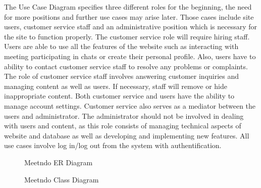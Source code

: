 \documentclass[conference]{IEEEtran}
\begin{document}
The Use Case Diagram specifies three different roles for the beginning, the need for more positions and further use cases may arise later. Those cases include site users, customer service staff and an administrative position which is necessary for the site to function properly. The customer service role will require hiring staff. Users are able to use all the features of the website such as interacting with meeting participating in chats or create their personal profile. Also, users have to ability to contact customer service staff to resolve any problems or complaints. The role of customer service staff involves answering customer inquiries and managing content as well as users. If necessary, staff will remove or hide inappropriate content. Both customer service and users have the ability to manage account settings. Customer service also serves as a mediator between the users and administrator. The administrator should not be involved in dealing with users and content, as this role consists of managing technical aspects of website and database as well as developing and implementing new features.
All use cases involve log in/log out from the system with authentification.

\clearpage
\begin{figure}[h!]
  \centering
  \caption { Meetndo ER Diagram}
\end{figure}


\begin{figure}[h!]
  \centering
  \caption { Meetndo Class Diagram}
\end{figure}
\end{document}
